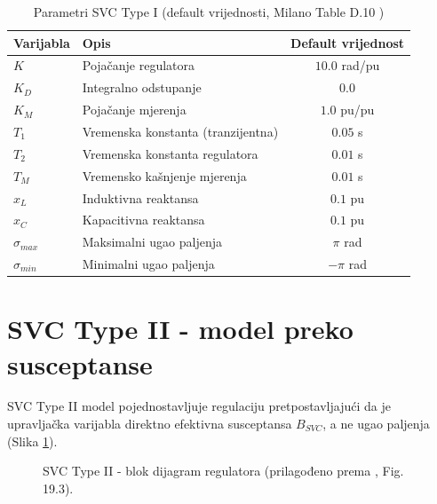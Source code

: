\documentclass[11pt,a4paper]{report}
\begin{document}
\begin{table}[H]
\centering
\caption{Parametri SVC Type I (default vrijednosti, Milano Table D.10 \cite{milano2010psms})}
\label{tab:svc1-params}
\begin{tabular}{@{}llc@{}}
\toprule
Varijabla & Opis & Default vrijednost \\
\midrule
$K$ & Pojačanje regulatora & $10.0$ rad/pu \\
$K_D$ & Integralno odstupanje & $0.0$ \\
$K_M$ & Pojačanje mjerenja & $1.0$ pu/pu \\
$T_1$ & Vremenska konstanta (tranzijentna) & $0.05$ s \\
$T_2$ & Vremenska konstanta regulatora & $0.01$ s \\
$T_M$ & Vremensko kašnjenje mjerenja & $0.01$ s \\
$x_L$ & Induktivna reaktansa & $0.1$ pu \\
$x_C$ & Kapacitivna reaktansa & $0.1$ pu \\
$\sigma_{max}$ & Maksimalni ugao paljenja & $\pi$ rad \\
$\sigma_{min}$ & Minimalni ugao paljenja & $-\pi$ rad \\
\bottomrule
\end{tabular}
\end{table}

\section{SVC Type II - model preko susceptanse}

SVC Type II model pojednostavljuje regulaciju pretpostavljajući da je upravljačka
varijabla direktno efektivna susceptansa $B_{SVC}$, a ne ugao paljenja (Slika
\ref{fig:svc2-block}).

\begin{figure}[H]
\centering
{}
\caption{SVC Type II - blok dijagram regulatora (prilagođeno prema \cite{milano2010psms}, Fig. 19.3).}
\label{fig:svc2-block}
\end{figure}
\end{document}
